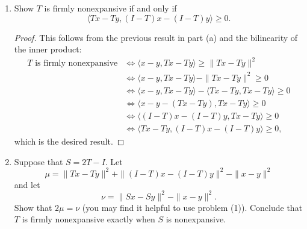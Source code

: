 \documentclass[11pt]{amsart}
\begin{document}
\begin{enumerate}
\begin{enumerate}
\begin{proof}
  Suppose $T$ is firmly nonexpansive.
  \begin{align*}
    \|Tx - Ty\|^2
    &+ \|(I-T) x - (I-T)y\|^2 \leq \|x-y\|^2 \\
    &\Leftrightarrow \|Tx - Ty\|^2 + \|(x-y)- (T x - T y)\|^2 \leq \|x-y\|^2 \\
    &\Leftrightarrow
      \|Tx - Ty\|^2 + \|(x-y)- (T x - T y)\|^2 \leq \|x-y\|^2 \\
    &\Leftrightarrow
      \|Tx - Ty\|^2 + \|x-y\|^2 + \|T x - T y)\|^2
      - 2\langle x - y, T x - T y\rangle \leq \|x-y\|^2 \\
    &\Leftrightarrow
      2\|Tx - Ty\|^2 \leq 2\langle x - y, T x - T y\rangle \\
    &\Leftrightarrow
      2\|Tx - Ty\|^2 \leq 2\langle x - y, T x - T y\rangle \\
    &\Leftrightarrow
      \langle x - y, T x - T y\rangle  \geq \|Tx - Ty\|^2,
  \end{align*}
  which is the desired result.
\end{proof}
\item Show $T$ is firmly nonexpansive if and only if 
\[
\langle Tx - Ty, (I-T)x - (I-T)y \rangle \geq 0. 
\]

\begin{proof}
  This follows from the previous result in part (a) and the bilinearity of the
  inner product:
  \begin{align*}
    \text{$T$ is firmly nonexpansive}
    &\Leftrightarrow \langle x-y, Tx - Ty \rangle \geq \|Tx - Ty\|^2 \\
    &\Leftrightarrow \langle x-y, Tx - Ty \rangle - \|Tx - Ty\|^2 \geq  0 \\
    &\Leftrightarrow \langle x-y, Tx - Ty \rangle - \langle Tx - Ty, Tx - Ty \rangle \geq  0 \\
    &\Leftrightarrow \langle x-y - (Tx - Ty), Tx - Ty \rangle \geq  0 \\
    &\Leftrightarrow \langle (I - T)x - (I - T)y, Tx - Ty \rangle \geq  0 \\
    &\Leftrightarrow \langle Tx - Ty, (I - T)x - (I - T)y \rangle \geq  0,
  \end{align*}
  which is the desired result.
\end{proof}

\item Suppose that $S = 2T - I$. Let 
\[
\mu = \|Tx - Ty\|^2 + \|(I-T)x - (I-T)y\|^2 - \|x-y\|^2
\]
and let 
\[
\nu = \|Sx - Sy\|^2 - \|x-y\|^2.
\]
Show that $2\mu = \nu$ (you may find it helpful to use problem (1)). Conclude that 
$T$ is firmly nonexpansive exactly when $S$ is nonexpansive.


\end{enumerate}
\end{enumerate}
\end{document}
